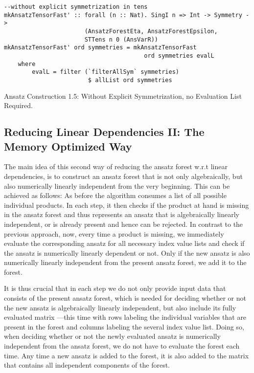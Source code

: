 \begin{listing}[hbt!]
\begin{verbatim}
--without explicit symmetrization in tens
mkAnsatzTensorFast' :: forall (n :: Nat). SingI n => Int -> Symmetry ->
                       (AnsatzForestEta, AnsatzForestEpsilon,
                       STTens n 0 (AnsVarR))
mkAnsatzTensorFast' ord symmetries = mkAnsatzTensorFast
                                        ord symmetries evalL
    where
        evalL = filter (`filterAllSym` symmetries) 
                        $ allList ord symmetries
\end{verbatim} 
\caption{Ansatz Construction 1.5: Without Explicit Symmetrization,  no Evaluation List Required.}\label{mkAnsatzFast'2}
\end{listing}

\subsection*{Reducing Linear Dependencies II:  The Memory Optimized Way}

The main idea of this second way of reducing the ansatz forest w.r.t linear dependencies, is to construct an ansatz forest that is not only algebraically, but also numerically linearly independent from the very beginning. This can be achieved as follows: As before the algorithm consumes a list of all possible individual products. In each step, it then checks if the product at hand is missing in the ansatz forest and thus represents an ansatz that is algebraically linearly independent, or is already present and hence can be rejected. In contrast to the previous approach, now, every time a product is missing, we immediately evaluate the corresponding ansatz for all necessary index value lists and check if the ansatz is numerically linearly dependent or not. Only if the new ansatz is also numerically linearly  independent from the present ansatz forest, we add it to the forest.

It is thus crucial that in each step we do not only provide input data that consists of the present ansatz forest, which is needed for deciding whether or not the new ansatz is algebraically linearly independent, but also include its fully evaluated matrix ---this time with rows labeling the individual variables that are present in the forest and columns labeling the several index value list.
Doing so, when deciding whether or not the newly evaluated ansatz is numerically  independent from the ansatz forest, we do not have to evaluate the forest each time. Any time a  new ansatz is added to the forest, it is also added to the matrix that contains all independent components of the forest.

